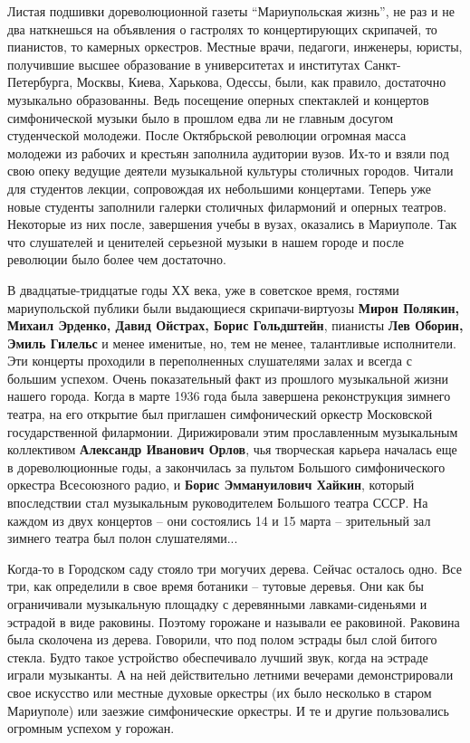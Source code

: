 Листая подшивки дореволюционной газеты \enquote{Мариупольская жизнь}, не раз и не два
наткнешься на объявления о гастролях то концертирующих скрипачей, то пианистов,
то камерных оркестров. Местные врачи, педагоги, инженеры, юристы, получившие
высшее образование в университетах и институтах Санкт-Петербурга, Москвы,
Киева, Харькова, Одессы, были, как правило, достаточно музыкально образованны.
Ведь посещение оперных спектаклей и концертов симфонической музыки было в
прошлом едва ли не главным досугом студенческой молодежи. После Октябрьской
революции огромная масса молодежи из рабочих и крестьян заполнила аудитории
вузов. Их-то и взяли под свою опеку ведущие деятели музыкальной культуры
столичных городов. Читали для студентов лекции, сопровождая их небольшими
концертами. Теперь уже новые студенты заполнили галерки столичных филармоний и
оперных театров. Некоторые из них после, завершения учебы в вузах, оказались в
Мариуполе. Так что слушателей и ценителей серьезной музыки в нашем городе и
после революции было более чем достаточно.

В двадцатые-тридцатые годы ХХ века, уже в советское время, гостями
мариупольской публики были выдающиеся скрипачи-виртуозы \textbf{Мирон Полякин, Михаил
Эрденко, Давид Ойстрах, Борис Гольдштейн}, пианисты \textbf{Лев Оборин, Эмиль Гилельс} и
менее именитые, но, тем не менее, талантливые исполнители. Эти концерты
проходили в переполненных слушателями залах и всегда с большим успехом. Очень
показательный факт из прошлого музыкальной жизни нашего города. Когда в марте
1936 года была завершена реконструкция зимнего театра, на его открытие был
приглашен симфонический оркестр Московской государственной филармонии.
Дирижировали этим прославленным музыкальным коллективом \textbf{Александр Иванович
Орлов}, чья творческая карьера началась еще в дореволюционные годы, а
закончилась за пультом Большого симфонического оркестра Всесоюзного радио, и
\textbf{Борис Эммануилович Хайкин}, который впоследствии стал музыкальным руководителем
Большого театра СССР. На каждом из двух концертов – они состоялись 14 и 15
марта – зрительный зал зимнего театра был полон слушателями...


Когда-то в Городском саду стояло три могучих дерева. Сейчас осталось одно. Все
три, как определили в свое время ботаники – тутовые деревья. Они как бы
ограничивали музыкальную площадку с деревянными лавками-сиденьями и эстрадой в
виде раковины. Поэтому горожане и называли ее раковиной. Раковина была
сколочена из дерева. Говорили, что под полом эстрады был слой битого стекла.
Будто такое устройство обеспечивало лучший звук, когда на эстраде играли
музыканты. А на ней действительно летними вечерами демонстрировали свое
искусство или местные духовые оркестры (их было несколько в старом Мариуполе)
или заезжие симфонические оркестры. И те и другие пользовались огромным успехом
у горожан.

